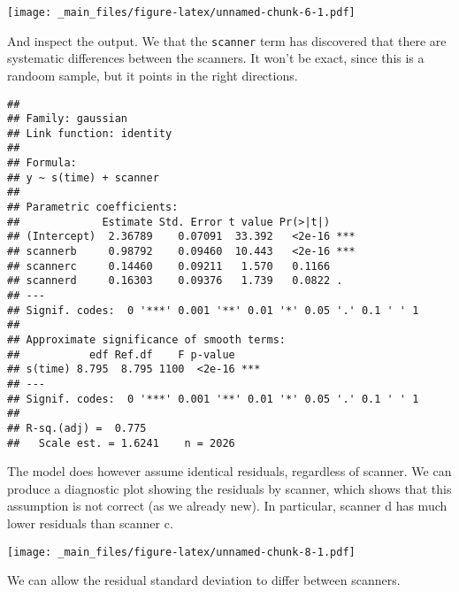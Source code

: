 \documentclass[
]{book}
\newenvironment{Shaded}{\begin{snugshade}}{\end{snugshade}}
\newcommand{\AttributeTok}[1]{\textcolor[rgb]{0.77,0.63,0.00}{#1}}
\newcommand{\FunctionTok}[1]{\textcolor[rgb]{0.00,0.00,0.00}{#1}}
\newcommand{\NormalTok}[1]{#1}
\newcommand{\SpecialCharTok}[1]{\textcolor[rgb]{0.00,0.00,0.00}{#1}}
\begin{document}
\texttt{[image: \_main\_files/figure-latex/unnamed-chunk-6-1.pdf]}

And inspect the output. We that the \texttt{scanner} term has discovered that there are systematic differences between the scanners. It won't be exact, since this is a randoom sample, but it points in the right directions.

\begin{Shaded}
\end{Shaded}

\begin{verbatim}
## 
## Family: gaussian 
## Link function: identity 
## 
## Formula:
## y ~ s(time) + scanner
## 
## Parametric coefficients:
##             Estimate Std. Error t value Pr(>|t|)    
## (Intercept)  2.36789    0.07091  33.392   <2e-16 ***
## scannerb     0.98792    0.09460  10.443   <2e-16 ***
## scannerc     0.14460    0.09211   1.570   0.1166    
## scannerd     0.16303    0.09376   1.739   0.0822 .  
## ---
## Signif. codes:  0 '***' 0.001 '**' 0.01 '*' 0.05 '.' 0.1 ' ' 1
## 
## Approximate significance of smooth terms:
##           edf Ref.df    F p-value    
## s(time) 8.795  8.795 1100  <2e-16 ***
## ---
## Signif. codes:  0 '***' 0.001 '**' 0.01 '*' 0.05 '.' 0.1 ' ' 1
## 
## R-sq.(adj) =  0.775   
##   Scale est. = 1.6241    n = 2026
\end{verbatim}

The model does however assume identical residuals, regardless of scanner. We can produce a diagnostic plot showing the residuals by scanner, which shows that this assumption is not correct (as we already new). In particular, scanner d has much lower residuals than scanner c.

\begin{Shaded}
\end{Shaded}

\texttt{[image: \_main\_files/figure-latex/unnamed-chunk-8-1.pdf]}

We can allow the residual standard deviation to differ between scanners.
\end{document}
